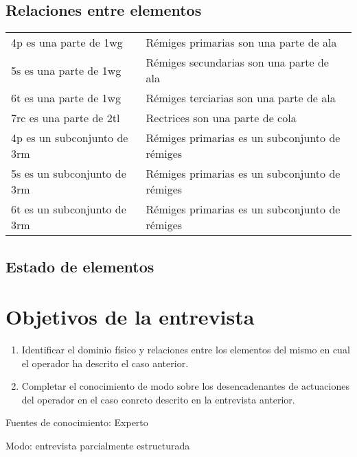 \documentclass[a4paper,12pt]{article}
\begin{document}
\subsection{Relaciones entre elementos}
\begin{table}[H]
	\centering
	\begin{tabular}{ll}
		4p es una parte de 1wg	& Rémiges primarias son una parte de ala	\\
		5s es una parte de 1wg	& Rémiges secundarias son una parte de ala	\\
		6t es una parte de 1wg	& Rémiges terciarias son una parte de ala	\\
		7rc es una parte de 2tl	& Rectrices son una parte de cola	\\
		4p es un subconjunto de 3rm	& Rémiges primarias es un subconjunto de rémiges	\\
		5s es un subconjunto de 3rm	& Rémiges primarias es un subconjunto de rémiges	\\
		6t es un subconjunto de 3rm	& Rémiges primarias es un subconjunto de rémiges	\\
	\end{tabular}
\end{table}

\subsection{Estado de elementos}

\section{Objetivos de la entrevista}
\begin{enumerate}[label=\Alph*]
	\item Identificar el dominio físico y relaciones entre los elementos del mismo en cual el operador ha descrito el caso anterior.
	\item Completar el conocimiento de modo sobre los desencadenantes de actuaciones del operador en el caso conreto descrito en la entrevista anterior.
\end{enumerate}

Fuentes de conocimiento: Experto

Modo: entrevista parcialmente estructurada
\end{document}
